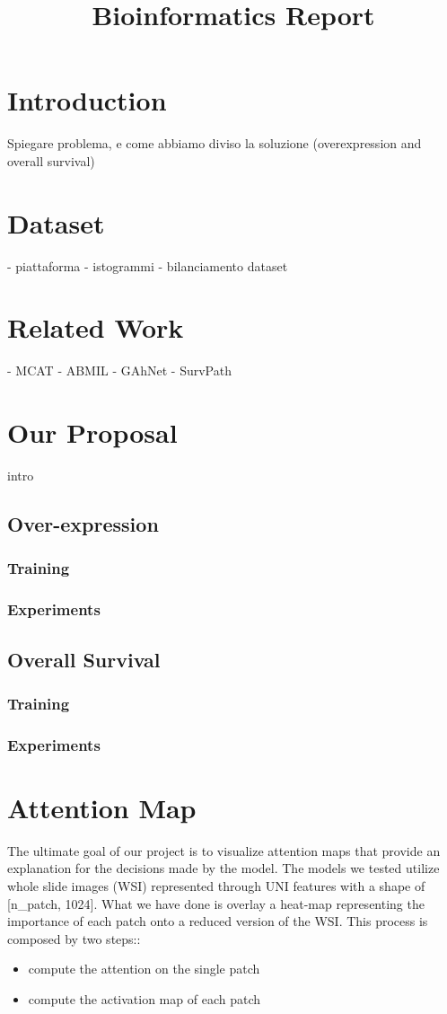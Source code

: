 \documentclass{article}
\title{Bioinformatics Report}
\begin{document}
\maketitle

\section{Introduction} %
Spiegare problema, e come abbiamo diviso la soluzione (overexpression and overall survival)
\section{Dataset} %
- piattaforma
- istogrammi
- bilanciamento dataset
\section{Related Work}
- MCAT
- ABMIL
-  GAhNet 
- SurvPath
\section{Our Proposal}
intro
\subsection{Over-expression} %
\subsubsection{Training}
\subsubsection{Experiments}

\subsection{Overall Survival} %
\subsubsection{Training}
\subsubsection{Experiments}


\section{Attention Map} %
The ultimate goal of our project is to visualize attention maps that provide an explanation for the decisions made by the model. The models we tested utilize whole slide images (WSI) represented through UNI features with a shape of [n\_patch, 1024]. What we have done is overlay a heat-map representing the importance of each patch onto a reduced version of the WSI.
This process is composed by two steps::
\begin{itemize}
	\item compute the attention on the single patch
	\item compute the activation map of each patch
\end{itemize}
\end{document}
